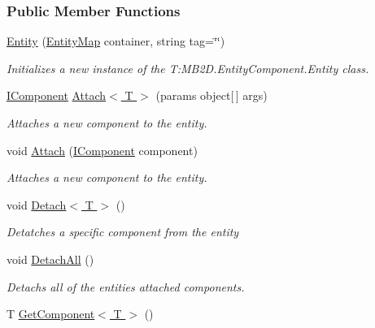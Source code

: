 \subsubsection*{Public Member Functions}
\begin{DoxyCompactItemize}
\item 
\hyperlink{class_m_b2_d_1_1_entity_component_1_1_entity_a6decb855bea1bcf18cd6c2869ebc16a6}{Entity} (\hyperlink{class_m_b2_d_1_1_entity_component_1_1_entity_map}{Entity\+Map} container, string tag=\char`\"{}\char`\"{})
\begin{DoxyCompactList}\small\item\em Initializes a new instance of the T\+:\+M\+B2\+D.\+Entity\+Component.\+Entity class. \end{DoxyCompactList}\item 
\hyperlink{interface_m_b2_d_1_1_entity_component_1_1_i_component}{I\+Component} \hyperlink{class_m_b2_d_1_1_entity_component_1_1_entity_a53ffea8d43423903712540fc2df6b82d}{Attach$<$ T $>$} (params object\mbox{[}$\,$\mbox{]} args)
\begin{DoxyCompactList}\small\item\em Attaches a new component to the entity. \end{DoxyCompactList}\item 
void \hyperlink{class_m_b2_d_1_1_entity_component_1_1_entity_aa86d1be62df6d89b981d1000c856a306}{Attach} (\hyperlink{interface_m_b2_d_1_1_entity_component_1_1_i_component}{I\+Component} component)
\begin{DoxyCompactList}\small\item\em Attaches a new component to the entity. \end{DoxyCompactList}\item 
void \hyperlink{class_m_b2_d_1_1_entity_component_1_1_entity_a9194f3b1f3370d2ecb47efe077ba4050}{Detach$<$ T $>$} ()
\begin{DoxyCompactList}\small\item\em Detatches a specific component from the entity \end{DoxyCompactList}\item 
void \hyperlink{class_m_b2_d_1_1_entity_component_1_1_entity_a5c006a368383ba7b17653d9f958ceaf8}{Detach\+All} ()
\begin{DoxyCompactList}\small\item\em Detachs all of the entities attached components. \end{DoxyCompactList}\item 
T \hyperlink{class_m_b2_d_1_1_entity_component_1_1_entity_a637f3b4df5ecd5d4e6c7630740d1676f}{Get\+Component$<$ T $>$} ()

\end{DoxyCompactItemize}
